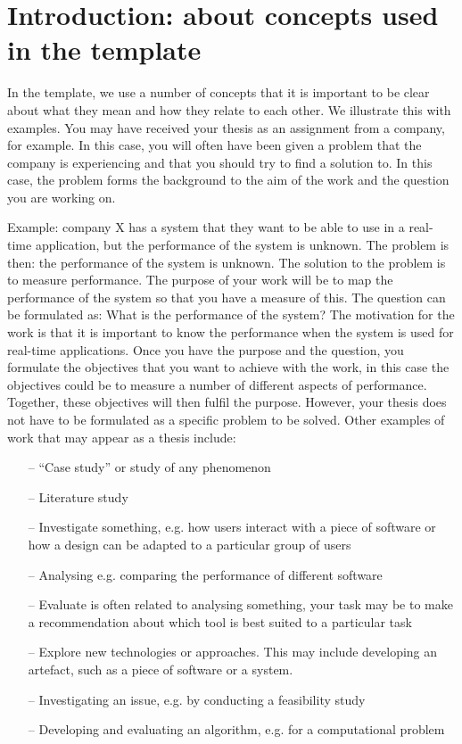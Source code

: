 \section*{Introduction: about concepts used in the template}

In the template, we use a number of concepts that it is important to be clear about what they mean and how they relate to each other.
We illustrate this with examples.
You may have received your thesis as an assignment from a company, for example.
In this case, you will often have been given a problem that the company is experiencing and that you should try to find a solution to. 
In this case, the problem forms the background to the aim of the work and the question you are working on.

Example: company X has a system that they want to be able to use in a real-time application, but the performance of the system is unknown. 
The problem is then: the performance of the system is unknown.
The solution to the problem is to measure performance.
The purpose of your work will be to map the performance of the system so that you have a measure of this. 
The question can be formulated as: What is the performance of the system? The motivation for the work is that it is important to know the performance when the system is used for real-time applications.
Once you have the purpose and the question, you formulate the objectives that you want to achieve with the work, in this case the objectives could be to measure a number of different aspects of performance. 
Together, these objectives will then fulfil the purpose. 
However, your thesis does not have to be formulated as a specific problem to be solved.
Other examples of work that may appear as a thesis include:

\begin{itemize}
    \item[--] ``Case study'' or study of any phenomenon
    \item[--] Literature study
    \item[--] Investigate something, e.g. how users interact with a piece of software or how a design can be adapted to a particular group of users
    \item[--] Analysing e.g. comparing the performance of different software
    \item[--] Evaluate is often related to analysing something, your task may be to make a recommendation about which tool is best suited to a particular task
    \item[--] Explore new technologies or approaches. This may include developing an artefact, such as a piece of software or a system. 
    \item[--] Investigating an issue, e.g. by conducting a feasibility study
    \item[--] Developing and evaluating an algorithm, e.g. for a computational problem
    \end{itemize}
    
